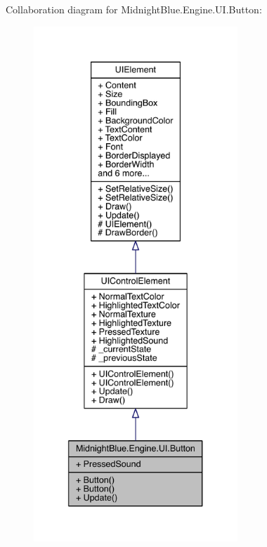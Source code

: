 Collaboration diagram for Midnight\+Blue.\+Engine.\+U\+I.\+Button\+:
\nopagebreak
\begin{figure}[H]
\begin{center}
\leavevmode
\includegraphics[height=550pt]{class_midnight_blue_1_1_engine_1_1_u_i_1_1_button__coll__graph}
\end{center}
\end{figure}
